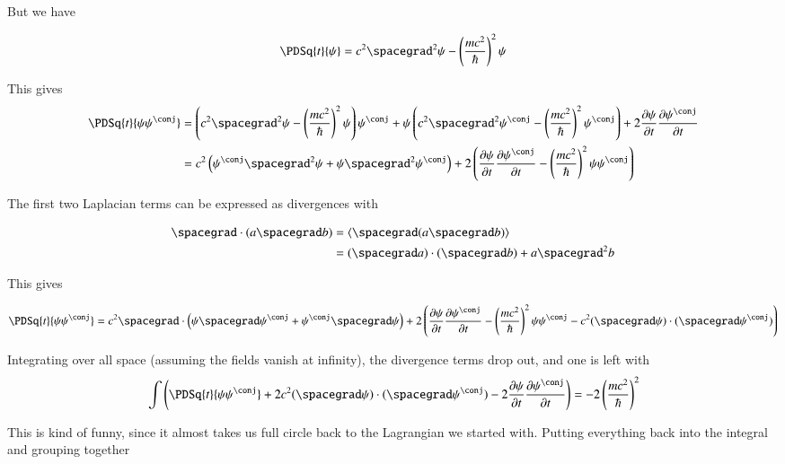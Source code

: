 But we have

\begin{align*}
\PDSq{t}{\psi} = c^2 \spacegrad^2 \psi - \left(\frac{m c^2}{\hbar} \right)^2 \psi
\end{align*}

This gives
\begin{align*}
\PDSq{t}{\psi\psi^\conj}
&=
\left( c^2 \spacegrad^2 \psi - \left(\frac{m c^2}{\hbar} \right)^2 \psi \right) \psi^\conj
+ \psi \left( c^2 \spacegrad^2 \psi^\conj - \left(\frac{m c^2}{\hbar} \right)^2 \psi^\conj \right)
+ 2 \PD{t}{\psi}\PD{t}{\psi^\conj}
\\
&=
c^2 \left( \psi^\conj \spacegrad^2 \psi + \psi \spacegrad^2 \psi^\conj \right)
+ 2 \left(
\PD{t}{\psi}\PD{t}{\psi^\conj} - \left( \frac{m c^2}{\hbar} \right)^2 \psi \psi^\conj
\right)
\\
\end{align*}

The first two Laplacian terms can be expressed as divergences with

\begin{align*}
\spacegrad \cdot (a \spacegrad b)
&=
\gpgradezero{ \spacegrad (a \spacegrad b) } \\
&=
(\spacegrad a) \cdot (\spacegrad b) + a \spacegrad^2 b
\end{align*}

This gives

\begin{align*}
\PDSq{t}{\psi\psi^\conj}
&=
c^2 \spacegrad \cdot \left( \psi \spacegrad \psi^\conj +\psi^\conj \spacegrad \psi \right)
+ 2 \left(
\PD{t}{\psi}\PD{t}{\psi^\conj} - \left( \frac{m c^2}{\hbar} \right)^2 \psi \psi^\conj
-c^2 (\spacegrad \psi) \cdot (\spacegrad \psi^\conj)
\right)
\\
\end{align*}

Integrating over all space (assuming the fields vanish at infinity), the divergence terms drop out, and one is left with
\begin{align*}
\int \left( \PDSq{t}{\psi\psi^\conj}
+ 2 c^2 (\spacegrad \psi) \cdot (\spacegrad \psi^\conj)
- 2 \PD{t}{\psi}\PD{t}{\psi^\conj}  \right)
&=
-2 \left( \frac{m c^2}{\hbar} \right)^2
\\
\end{align*}

This is kind of funny, since it almost takes us full circle back to the Lagrangian we started with.  Putting everything
back into the integral and grouping together

